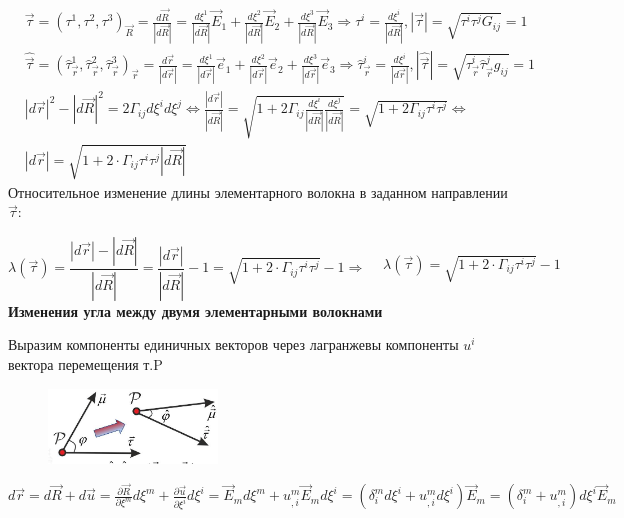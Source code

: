 $$
\begin{aligned}
& \vec{\tau}=\left(\tau^1, \tau^2, \tau^3\right)_{\vec{R}}=\frac{d \vec{R}}{|d \vec{R}|}=\frac{d \xi^1}{|d \vec{R}|} \vec{E}_1+\frac{d \xi^2}{|d \vec{R}|} \vec{E}_2+\frac{d \xi^3}{|d \vec{R}|} \vec{E}_3 \Rightarrow \tau^i=\frac{d \xi^i}{|d \vec{R}|},|\vec{\tau}|=\sqrt{\tau^i \tau^j G_{i j}}=1 \\
& \hat{\vec{\tau}}=\left(\hat{\tau}_{\vec{r}}^1, \hat{\tau}_{\vec{r}}^2, \hat{\tau}_{\vec{r}}^3\right)_{\vec{r}}=\frac{d \vec{r}}{|d \vec{r}|}=\frac{d \xi^1}{|d \vec{r}|} \vec{e}_1+\frac{d \xi^2}{|d \vec{r}|} \vec{e}_2+\frac{d \xi^3}{|d \vec{r}|} \vec{e}_3 \Rightarrow \hat{\tau}_{\vec{r}}^i=\frac{d \xi^i}{|d \vec{r}|},|\hat{\vec{\tau}}|=\sqrt{\hat{\tau}_{\vec{r}}^i \hat{\tau}_{\vec{r}}^j g_{i j}}=1 \\
&|d \vec{r}|^2-|d \vec{R}|^2=2 \Gamma_{i j} d \xi^i d \xi^j \Leftrightarrow \frac{|d \vec{r}|}{|d \vec{R}|}=\sqrt{1+2 \Gamma_{i j} \frac{d \xi^i}{|d \vec{R}|} \frac{d \xi^j}{|d \vec{R}|}}=\sqrt{1+2 \Gamma_{i j} \tau^i \tau^j} \Leftrightarrow\\
&|d \vec{r}|=\sqrt{1+2 \cdot \Gamma_{i j} \tau^i \tau^j|d \vec{R}|}
\end{aligned}
$$
 Относительное изменение длины элементарного волокна в заданном направлении $\vec{\tau}$:

$$
\lambda(\vec{\tau})=\frac{|d \vec{r}|-|d \vec{R}|}{|d \vec{R}|}=\frac{|d \vec{r}|}{|d \vec{R}|}-1=\sqrt{1+2 \cdot \Gamma_{i j} \tau^i \tau^j}-1 \Rightarrow \begin{aligned}
& \lambda(\vec{\tau})=\sqrt{1+2 \cdot \Gamma_{i j} \tau^i \tau^j}-1 
\end{aligned}
$$
\textbf{Изменения угла между двумя элементарными волокнами} 


Выразим компоненты единичных векторов через лагранжевы компоненты $ u^i$  вектора перемещения т.P  

\begin{figure}[h!]
  \centering
  \includegraphics[width=0.4\textwidth]{images/10.3.jpg} 
\end{figure}



$ d \vec{r}=d \vec{R}+d \vec{u}=\frac{\partial \vec{R}}{\partial \xi^m} d \xi^m+\frac{\partial \vec{u}}{\partial \xi^i} d \xi^i=\vec{E}_m d \xi^m+u_{, i}^m \vec{E}_m d \xi^i=\left(\delta_i^m d \xi^i+u_{, i}^m d \xi^i\right) \vec{E}_m=\left(\delta_i^m+u_{, i}^m\right) d \xi^i \vec{E}_m$


